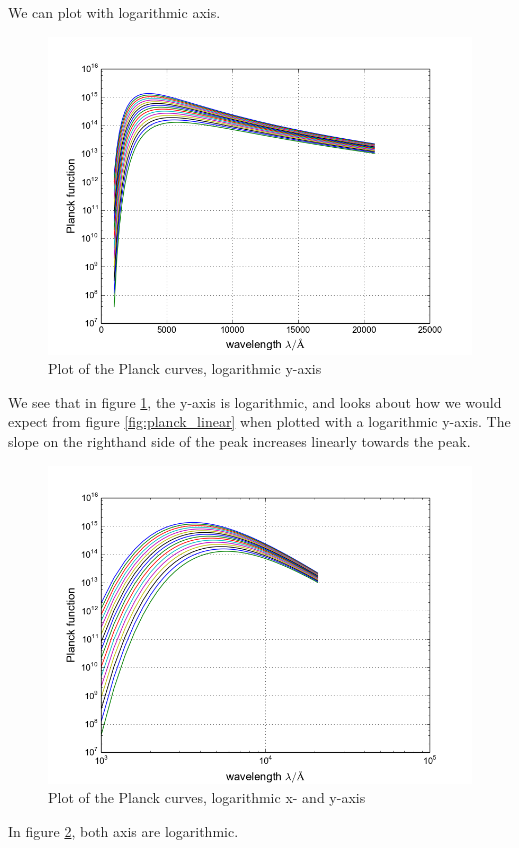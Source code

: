\documentclass{article}
\begin{document}
We can plot with logarithmic axis.
\begin{figure}[H]
  \centering
  \includegraphics[scale=0.5]{ssa_3_1_logy.png}
  \caption{Plot of the Planck curves, logarithmic y-axis}
  \label{fig:planck_logy}
\end{figure}
We see that in figure \ref{fig:planck_logy}, the y-axis is logarithmic, and looks about how we would expect from figure \ref{fig:planck_linear} when plotted with a logarithmic y-axis. The slope on the righthand side of the peak increases linearly towards the peak.
\begin{figure}[H]
  \centering
  \includegraphics[scale=0.5]{ssa_3_1_loglog.png}
  \caption{Plot of the Planck curves, logarithmic x- and y-axis}
  \label{fig:planck_loglog}
\end{figure}
In figure \ref{fig:planck_loglog}, both axis are logarithmic.
\end{document}

